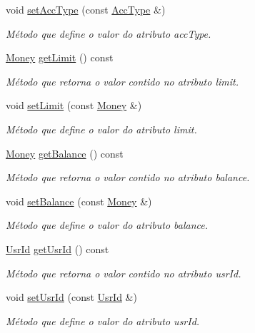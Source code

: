 \begin{DoxyCompactItemize}
void \hyperlink{classAccount_a3a8e8aa0094b2af0496d45714f694256}{set\-Acc\-Type} (const \hyperlink{classUsrType}{Acc\-Type} \&)
\begin{DoxyCompactList}\small\item\em Método que define o valor do atributo acc\-Type. \end{DoxyCompactList}\item 
\hyperlink{classMoney}{Money} \hyperlink{classAccount_ac67a380f5f320a44f9bb464f6efd59f7}{get\-Limit} () const 
\begin{DoxyCompactList}\small\item\em Método que retorna o valor contido no atributo limit. \end{DoxyCompactList}\item 
void \hyperlink{classAccount_ada9bd7d0aee82d5b6c8f9831eb6fd8d5}{set\-Limit} (const \hyperlink{classMoney}{Money} \&)
\begin{DoxyCompactList}\small\item\em Método que define o valor do atributo limit. \end{DoxyCompactList}\item 
\hyperlink{classMoney}{Money} \hyperlink{classAccount_af9414bc748bf1923b2308544bbfd8b82}{get\-Balance} () const 
\begin{DoxyCompactList}\small\item\em Método que retorna o valor contido no atributo balance. \end{DoxyCompactList}\item 
void \hyperlink{classAccount_a0c54b27c54fd64b93d31aecdf7f3f302}{set\-Balance} (const \hyperlink{classMoney}{Money} \&)
\begin{DoxyCompactList}\small\item\em Método que define o valor do atributo balance. \end{DoxyCompactList}\item 
\hyperlink{classUsrId}{Usr\-Id} \hyperlink{classAccount_a59a83e5c5142f79402e79a8d42b36aed}{get\-Usr\-Id} () const 
\begin{DoxyCompactList}\small\item\em Método que retorna o valor contido no atributo usr\-Id. \end{DoxyCompactList}\item 
void \hyperlink{classAccount_a97146ede9747001294bcd41c74abd67a}{set\-Usr\-Id} (const \hyperlink{classUsrId}{Usr\-Id} \&)
\begin{DoxyCompactList}\small\item\em Método que define o valor do atributo usr\-Id. \end{DoxyCompactList}\end{DoxyCompactItemize}


